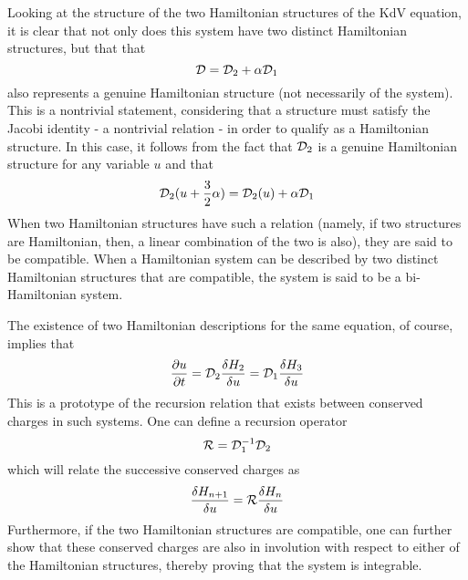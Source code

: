 \documentclass[a4paper,11pt]{article}
\begin{document}
Looking at the structure of the two Hamiltonian structures of the KdV
equation, it is clear that not only does this system have two
distinct Hamiltonian structures, but that that
\begin{equation}
{\cal D} = {\cal D}_{2} + \alpha {\cal D}_{1}
\end{equation}
also represents a genuine Hamiltonian structure (not necessarily of
the system). This is a nontrivial statement, considering that a
structure must satisfy the Jacobi identity - a nontrivial relation -
in order to qualify as a Hamiltonian structure. In this case, it
follows from the fact that ${\cal D}_{2}$ is a genuine Hamiltonian
structure for any variable $u$ and that
\begin{equation}
{\cal D}_{2} (u + {3\over 2} \alpha) = {\cal D}_{2} (u) + \alpha {\cal
D}_{1}
\end{equation}
When two Hamiltonian structures have such a relation (namely, if two
structures are Hamiltonian, then, a linear combination of the two is
also), they are said to be compatible. When a Hamiltonian system can
be described by two distinct Hamiltonian structures that are
compatible, the system is said to be a bi-Hamiltonian system. 

The existence of two Hamiltonian descriptions for the same equation,
of course, implies that
\begin{equation}
{\partial u\over \partial t} = {\cal D}_{2} {\delta H_{2}\over \delta
u} = {\cal D}_{1} {\delta H_{3}\over \delta u}
\end{equation}
This is a prototype of the recursion relation that exists between
conserved charges in such systems. One can define a recursion operator
\begin{equation}
{\cal R} = {\cal D}_{1}^{-1} {\cal D}_{2}
\end{equation}
which will relate the successive conserved charges as
\begin{equation}
{\delta H_{n+1}\over \delta u} = {\cal R} {\delta H_{n}\over \delta u}
\end{equation}
Furthermore, if the two Hamiltonian structures are compatible, one can
further show that these conserved charges are also in involution with
respect to either of the Hamiltonian structures, thereby proving that
the system is integrable.
\end{document}
